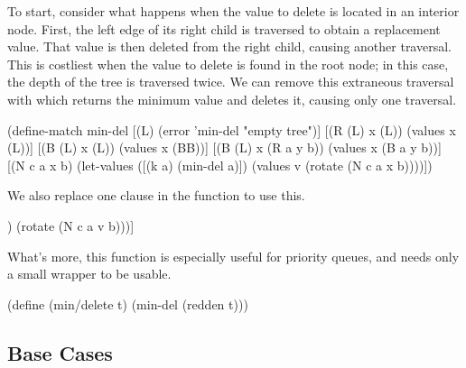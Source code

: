 \documentclass[preprint]{sigplanconf}
\begin{document}
To start, consider what happens when the value to delete is located in an interior node. First, the left edge of its right child is traversed to obtain a replacement value. That value is then deleted from the right child, causing another traversal. This is costliest when the value to delete is found in the root node; in this case, the depth of the tree is traversed twice. We can remove this extraneous traversal with  which returns the minimum value and deletes it, causing only one traversal.
\begin{schemedisplay}
(define-match min-del
  [(L) (error 'min-del "empty tree")]
  [(R (L) x (L)) (values x (L))]
  [(B (L) x (L)) (values x (BB))]
  [(B (L) x (R a y b)) (values x (B a y b))]
  [(N c a x b) (let-values ([(k a) (min-del a)])
                 (values v (rotate (N c a x b))))])
\end{schemedisplay}
We also replace one clause in the  function to use this.
\begin{schemedisplay}
[= (let-values ([(v b) (min-del b)])
     (rotate (N c a v b)))]
\end{schemedisplay}

What's more, this function is especially useful for priority queues, and needs only a small wrapper to be usable.
\begin{schemedisplay}
  (define (min/delete t)
    (min-del (redden t)))
\end{schemedisplay}

\subsection{Base Cases}
\end{document}
